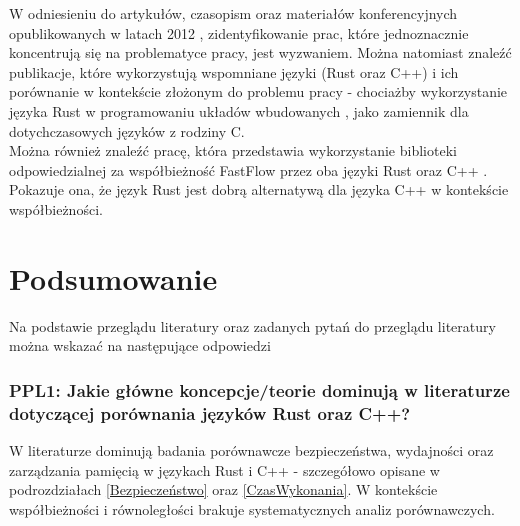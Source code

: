 W odniesieniu do artykułów, czasopism oraz materiałów konferencyjnych opublikowanych w latach 2012 , zidentyfikowanie prac, które jednoznacznie koncentrują się na problematyce pracy, jest wyzwaniem. Można natomiast znaleźć publikacje, które wykorzystują wspomniane języki (Rust oraz C++) i ich porównanie w kontekście złożonym do problemu pracy - chociażby wykorzystanie języka Rust w programowaniu układów wbudowanych \cite{ZamiennikWEmbedded}, jako zamiennik dla dotychczasowych języków z rodziny C.\\
Można również znaleźć pracę, która przedstawia wykorzystanie biblioteki odpowiedzialnej za współbieżność FastFlow przez oba języki Rust oraz C++ \cite{FastFlow}. Pokazuje ona, że język Rust jest dobrą alternatywą dla języka C++ w kontekście współbieżności.


\section{Podsumowanie}
Na podstawie przeglądu literatury oraz zadanych pytań do przeglądu literatury można wskazać na następujące odpowiedzi
\subsubsection{PPL1: Jakie główne koncepcje/teorie dominują w literaturze dotyczącej porównania języków Rust oraz C++?}
W literaturze dominują badania porównawcze bezpieczeństwa, wydajności oraz zarządzania pamięcią w językach Rust i C++ \cite{PPL1_1} - szczegółowo opisane w podrozdziałach \ref{Bezpieczeństwo} oraz \ref{CzasWykonania}. W kontekście współbieżności i równoległości brakuje systematycznych analiz porównawczych.


